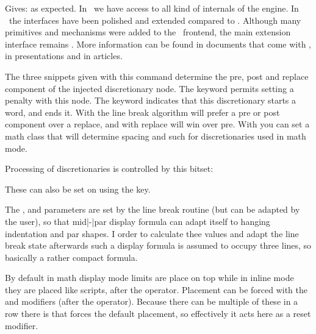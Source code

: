 \startbuffer
{}
\stopbuffer

Gives: \quotation {\inlinebuffer} as expected. In \LUA\ we have access to all
kind of internals of the engine. In \LUAMETATEX\ the interfaces have been
polished and extended compared to \LUATEX. Although many primitives and
mechanisms were added to the \TEX\ frontend, the main extension interface remains
\LUA. More information can be found in documents that come with \CONTEXT, in
presentations and in articles.

\stopnewprimitive

\startoldprimitive[title={\prm {discretionary}}]

The three snippets given with this command determine the pre, post and replace
component of the injected discretionary node. The  keyword permits
setting a penalty with this node. The  keyword indicates that
this discretionary starts a word, and  ends it. With 
the line break algorithm will prefer a pre or post component over a replace, and
with  replace will win over pre. With  you can set a
math class that will determine spacing and such for discretionaries used in math
mode.

\stopoldprimitive

\startnewprimitive[title={\prm {discretionaryoptions}}]

Processing of discretionaries is controlled by this bitset:


These can also be set on  using the  key.

\stopnewprimitive

\startoldprimitive[title={\prm {displayindent}}]

The ,  and 
parameters are set by the line break routine (but can be adapted by the user), so
that mid|-|par display formula can adapt itself to hanging indentation and par
shapes. I order to calculate thee values and adapt the line break state
afterwards such a display formula is assumed to occupy three lines, so basically
a rather compact formula.

\stopoldprimitive

\startoldprimitive[title={\prm {displaylimits}}]

By default in math display mode limits are place on top while in inline mode they
are placed like scripts, after the operator. Placement can be forced with the
 and  modifiers (after the operator). Because there
can be multiple of these in a row there is  that forces the
default placement, so effectively it acts here as a reset modifier.

